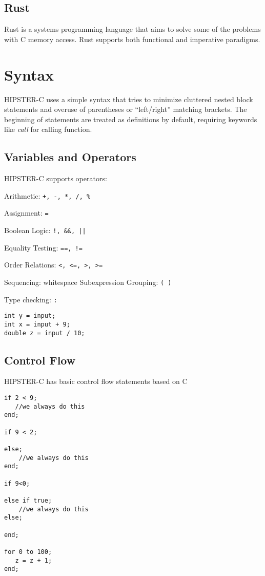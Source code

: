 \documentclass{article}
\begin{document}
\subsection{Rust}
Rust is a systems programming language that aims to solve some of the problems with C memory access. Rust supports both functional and imperative paradigms.




\section{Syntax}
HIPSTER-C uses a simple syntax that tries to minimize cluttered nested block statements and overuse of parentheses or ``left/right'' matching brackets. The beginning of statements are treated as definitions by default, requiring keywords like \textit{call} for calling function.  


\subsection{Variables and Operators}
HIPSTER-C supports operators:\par
Arithmetic: \texttt{+, -, *, /, \%}\par 
Assignment: \texttt{=}\par
Boolean Logic: \texttt{!, \&\&, ||}\par
Equality Testing: \texttt{==, !=}\par
Order Relations: \texttt{<, <=, >, >=}\par
Sequencing: whitespace
Subexpression Grouping: \texttt{( )}\par
Type checking: \texttt{:}


\begin{verbatim}
int y = input;
int x = input + 9;
double z = input / 10;
\end{verbatim}


\subsection{Control Flow}
HIPSTER-C has basic control flow statements based on C

\begin{verbatim}
if 2 < 9;
   //we always do this
end; 

if 9 < 2;

else;
    //we always do this
end;

if 9<0;

else if true;
    //we always do this
else;

end; 

for 0 to 100;
   z = z + 1;
end;

\end{verbatim}
\end{document}
